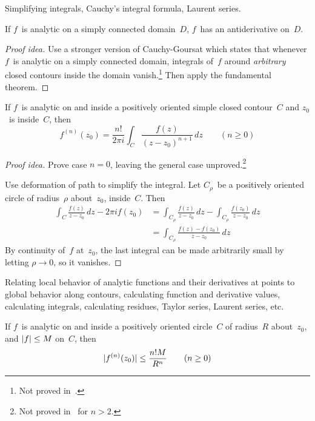 \begin{app}
Simplifying integrals, Cauchy's integral formula, Laurent series.
\end{app}
\begin{cor}
If \(f\)~is analytic on a simply connected domain~\(D\), \(f\)~has an antiderivative on~\(D\).
\end{cor}
\begin{proof}[Proof idea]
Use a stronger version of Cauchy-Goursat which states that whenever \(f\)~is analytic on a simply connected domain, integrals of~\(f\) around \emph{arbitrary} closed contours inside the domain vanish.\footnote{Not proved in~\cite{brown04}.} Then apply the fundamental theorem.
\end{proof}

\begin{thm}
If \(f\)~is analytic on and inside a positively oriented simple closed contour~\(C\) and \(z_0\)~is inside~\(C\), then
\[f^{(n)}(z_0)=\frac{n!}{2\pi i}\int_C\frac{f(z)}{(z-z_0)^{n+1}}\,dz\qquad(n\ge0)\]
\end{thm}
\begin{proof}[Proof idea]
Prove case \(n=0\), leaving the general case unproved.\footnote{Not proved in~\cite{brown04} for \(n>2\).}

Use deformation of path to simplify the integral. Let \(C_{\rho}\)~be a positively oriented circle of radius~\(\rho\) about~\(z_0\), inside~\(C\). Then
\begin{align*}
\int_C\frac{f(z)}{z-z_0}\,dz-2\pi if(z_0)&=\int_{C_{\rho}}\frac{f(z)}{z-z_0}\,dz-\int_{C_{\rho}}\frac{f(z_0)}{z-z_0}\,dz\\
	&=\int_{C_{\rho}}\frac{f(z)-f(z_0)}{z-z_0}\,dz
\end{align*}
By continuity of~\(f\) at~\(z_0\), the last integral can be made arbitrarily small by letting \(\rho\to0\), so it vanishes.
\end{proof}
\begin{app}
Relating local behavior of analytic functions and their derivatives at points to global behavior along contours, calculating function and derivative values, calculating integrals, calculating residues, Taylor series, Laurent series, etc.
\end{app}

\begin{cor}
If \(f\)~is analytic on and inside a positively oriented circle~\(C\) of radius~\(R\) about~\(z_0\), and \(|{f}|\le M\) on~\(C\), then
\[|{f^{(n)}(z_0)}|\le\frac{n!M}{R^n}\qquad(n\ge0)\]
\end{cor}


